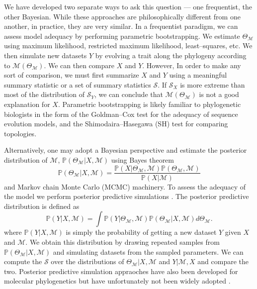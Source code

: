 \documentclass[a4paper,12pt]{article}
\begin{document}
We have developed two separate ways to ask this question --- one frequentist, the other Bayesian. While these approaches are philosophically different from one another, in practice, they are very similar. In a frequentist paradigm, we can assess model adequacy by performing parametric bootstrapping. We estimate $\Theta_{\mathcal{M}}$ using maximum likelihood, restricted maximum likelihood, least--squares, etc. We then simulate new datasets $Y$ by evolving a trait along the phylogeny according to $\mathcal{M}(\Theta_{\mathcal{M}})$. We can then compare $X$ and $Y$. However, In order to make any sort of comparison, we must first summarize $X$ and $Y$ using a meaningful summary statistic or a set of summary statistics $\mathcal{S}$. If $\mathcal{S}_X$ is more extreme than most of the distribution of $\mathcal{S}_Y$, we can conclude that $\mathcal{M}(\Theta_{\mathcal{M}})$ is not a good explanation for $X$. Parametric bootstrapping is likely familiar to phylogenetic biologists in the form of the Goldman--Cox test \citep{Goldman} for the adequacy of sequence evolution models, and the Shimodaira--Hasegawa (SH) test \citep{SH} for comparing topologies. 

Alternatively, one may adopt a Bayesian perspective and estimate the posterior distribution of $\mathcal{M}$, $\mathbb{P}(\Theta_{\mathcal{M}}|X,\mathcal{M})$ using Bayes theorem
\[\mathbb{P}(\Theta_{\mathcal{M}}|X,\mathcal{M}) = \frac{\mathbb{P}(X|\Theta_{\mathcal{M}}, \mathcal{M})\mathbb{P}(\Theta_\mathcal{M}, \mathcal{M})}{\mathbb{P}(X|\mathcal{M})} \]
and Markov chain Monte Carlo (MCMC) machinery. To assess the adequacy of the model we perform posterior predictive simulations \citep{Rubin1984, Gelman1996}. The posterior predictive distribution is defined as
\[\mathbb{P}(Y|X,\mathcal{M}) = \int \mathbb{P}(Y|\Theta_{\mathcal{M}}, \mathcal{M})\mathbb{P}(\Theta_{\mathcal{M}}|X,\mathcal{M})d\Theta_{\mathcal{M}}. \]
where $\mathbb{P}(Y|X,\mathcal{M})$ is simply the probability of getting a new dataset $Y$ given $X$ and $\mathcal{M}$. We obtain this distribution by drawing repeated samples from $\mathbb{P}(\Theta_{\mathcal{M}}|X,\mathcal{M})$ and simulating datasets from the sampled parameters. We can compute the $\mathcal{S}$ over the distributions of $\Theta_{\mathcal{M}}|X,\mathcal{M}$ and $Y|\mathcal{M},X$ and compare the two. Posterior predictive simulation appraoches have also been developed for molecular phylogenetics \citep{Bollback2002, Reid2013, Lewis2013, Brown2013} but have unfortunately not been widely adopted \citep{Brown2013}.
\end{document}
